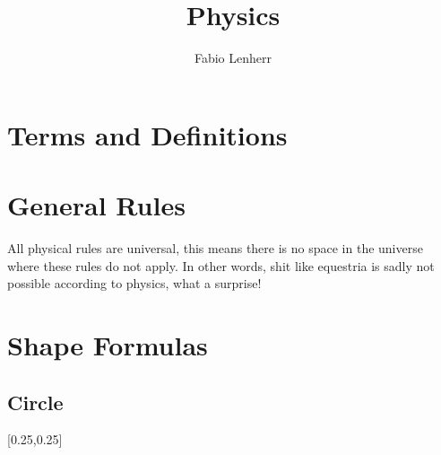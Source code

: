 \documentclass[main.tex,fontsize=8pt,paper=a4,paper=portrait,DIV=calc,]{scrartcl}
\title{Physics}
\author{Fabio Lenherr}
\begin{document}
\tableofcontents

\section{Terms and Definitions}

\begin{multicols*}{2}

\section{General Rules}
All physical rules are universal, this means there is no space in the universe where these rules do not apply.\newline
In other words, shit like equestria is sadly not possible according to physics, what a surprise!

\section{Shape Formulas}
\subsection{Circle}
[0.25,0.25]


\end{multicols*}
\end{document}
